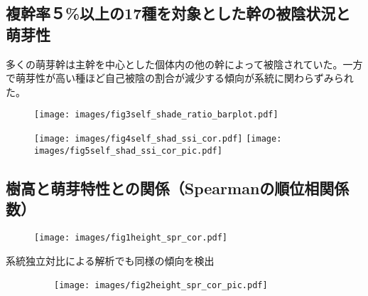 \documentclass[a0, 30pt, plainboxedsections]{sciposter} %
\renewcommand{\baselinestretch}{1.2}
\begin{document}
\begin{multicols}{2}
\renewcommand{\baselinestretch}{0.8}
\begin{mdframed}[style=subsection.frame]
  \huge\textbf{}
\end{mdframed}
\renewcommand{\baselinestretch}{1.2}


\subsection*{複幹率５\%以上の17種を対象とした幹の被陰状況と萌芽性}

多くの萌芽幹は主幹を中心とした個体内の他の幹によって被陰されていた。一方で萌芽性が高い種ほど自己被陰の割合が減少する傾向が系統に関わらずみられた。

\begin{multicols}{2}

\begin{figure}
	\centering
		\texttt{[image: images/fig3self\_shade\_ratio\_barplot.pdf]}
\end{figure}

\columnbreak
\begin{figure}
	\centering				
		\texttt{[image: images/fig4self\_shad\_ssi\_cor.pdf]}
		\texttt{[image: images/fig5self\_shad\_ssi\_cor\_pic.pdf]}
\end{figure}
\end{multicols}

\columnbreak
\renewcommand{\baselinestretch}{0.8}
\begin{mdframed}[style=subsection.frame]
  \huge\textbf{}
\end{mdframed}
\renewcommand{\baselinestretch}{1.2} %

\subsection*{樹高と萌芽特性との関係（Spearmanの順位相関係数）}

\begin{figure}
	\centering
		\texttt{[image: images/fig1height\_spr\_cor.pdf]}
\end{figure}

系統独立対比による解析でも同様の傾向を検出

\begin{figure}
	\centering
	　　\texttt{[image: images/fig2height\_spr\_cor\_pic.pdf]}
\end{figure}

\end{multicols}
\begin{mdframed}[style=section.frame]
  \centering\huge\textbf{}
\end{mdframed}
\end{document}

